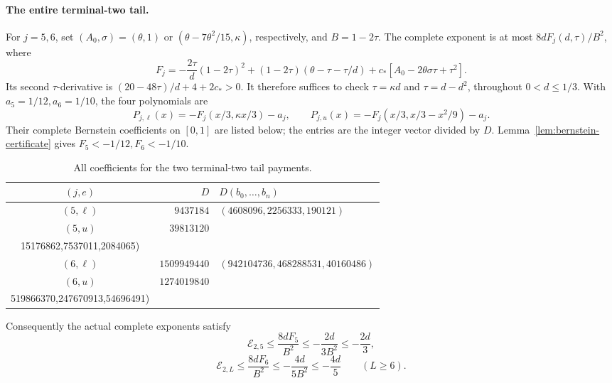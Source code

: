 \paragraph{The entire terminal-two tail.}
For \(j=5,6\), set
\((A_0,\sigma)=(\theta,1)\) or
\((\theta-7\theta^2/15,\kappa)\), respectively, and \(B=1-2\tau\).
The complete exponent is at most \(8dF_j(d,\tau)/B^2\), where
\begin{equation}\label{eq:short2:tail-scalar}
 F_j=-\frac{2\tau}{d}(1-2\tau)^2
 +(1-2\tau)(\theta-\tau-\tau/d)
 +c_*[A_0-2\theta\sigma\tau+\tau^2].
\end{equation}
Its second \(\tau\)-derivative is
\((20-48\tau)/d+4+2c_*>0\). It therefore suffices to check
\(\tau=\kappa d\) and \(\tau=d-d^2\), throughout \(0<d\le1/3\).
With \(a_5=1/12,a_6=1/10\), the four polynomials are
\begin{equation}\label{eq:ordinary-short2-endpoint-polynomials}
 P_{j,\ell}(x)=-F_j(x/3,\kappa x/3)-a_j,\qquad
 P_{j,u}(x)=-F_j(x/3,x/3-x^2/9)-a_j .
\end{equation}
Their complete Bernstein coefficients on \([0,1]\) are listed below;
the entries are the integer vector divided by \(D\).
Lemma~\ref{lem:bernstein-certificate} gives \(F_5<-1/12,F_6<-1/10\).
\begin{table}[htbp]\centering\small\setlength{\tabcolsep}{4pt}
\caption{All coefficients for the two terminal-two tail payments.}
\label{tab:ordinary-short2-bernstein}
\begin{tabular}{@{}crl@{}}\toprule
\((j,e)\)&\(D\)&\(D(b_0,\ldots,b_n)\)\\\midrule
\((5,\ell)\)&\(9437184\)&\((4608096,2256333,190121)\)\\
\((5,u)\)&\(39813120\)&\(\begin{gathered}
 (67962645,42533343,26218242,\\15176862,7537011,2084065)
 \end{gathered}\)\\
\((6,\ell)\)&\(1509949440\)&\((942104736,468288531,40160486)\)\\
\((6,u)\)&\(1274019840\)&\(\begin{gathered}
 (2347612551,1478434437,910150830,\\519866370,247670913,54696491)
 \end{gathered}\)\\\bottomrule
\end{tabular}
\end{table}
Consequently the actual complete exponents satisfy
\begin{equation}\label{eq:ordinary-short2-L5-paid}
 \mathcal E_{2,5}\le\frac{8dF_5}{B^2}
 \le-\frac{2d}{3B^2}\le-\frac{2d}{3},
\end{equation}
\begin{equation}\label{eq:ordinary-short2-Lge6-paid}
 \mathcal E_{2,L}\le\frac{8dF_6}{B^2}
 \le-\frac{4d}{5B^2}\le-\frac{4d}{5}\qquad(L\ge6).
\end{equation}

